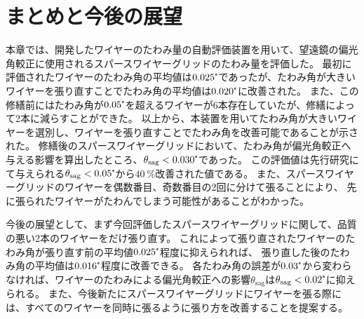 \documentclass[../../main.tex]{subfiles}
\begin{document}
\section{まとめと今後の展望}
本章では、開発したワイヤーのたわみ量の自動評価装置を用いて、望遠鏡の偏光角較正に使用されるスパースワイヤーグリッドのたわみ量を評価した。
最初に評価されたワイヤーのたわみ角の平均値は$0.025\tcdegree$であったが、たわみ角が大きいワイヤーを張り直すことでたわみ角の平均値は$0.020\tcdegree$に改善された。
また、この修繕前にはたわみ角が$0.05\tcdegree$を超えるワイヤーが6本存在していたが、修繕によって2本に減らすことができた。
以上から、本装置を用いてたわみ角が大きいワイヤーを選別し、ワイヤーを張り直すことでたわみ角を改善可能であることが示された。
修繕後のスパースワイヤーグリッドにおいて、たわみ角が偏光角較正へ与える影響を算出したところ、$\theta_{\mathrm{sag}}<0.030\tcdegree$であった。
この評価値は先行研究にて与えられる$\theta_{\mathrm{sag}}<0.05\tcdegree$から$\SI{40}{\%}$改善された値である。
また、スパースワイヤーグリッドのワイヤーを偶数番目、奇数番目の2回に分けて張ることにより、
先に張られたワイヤーがたわんでしまう可能性があることがわかった。

今後の展望として、まず今回評価したスパースワイヤーグリッドに関して、品質の悪い2本のワイヤーをだけ張り直す。
これによって張り直されたワイヤーのたわみ角が張り直す前の平均値$0.025\tcdegree$程度に抑えられれば、
張り直した後のたわみ角の平均値は$0.016\tcdegree$程度に改善できる。
各たわみ角の誤差が$0.03\tcdegree$から変わらなければ、ワイヤーのたわみによる偏光角較正への影響$\theta_{\mathrm{sag}}$は$\theta_{\mathrm{sag}}<0.02\tcdegree$に抑えられる。
また、今後新たにスパースワイヤーグリッドにワイヤーを張る際には、すべてのワイヤーを同時に張るように張り方を改善することを提案する。

\end{document}
